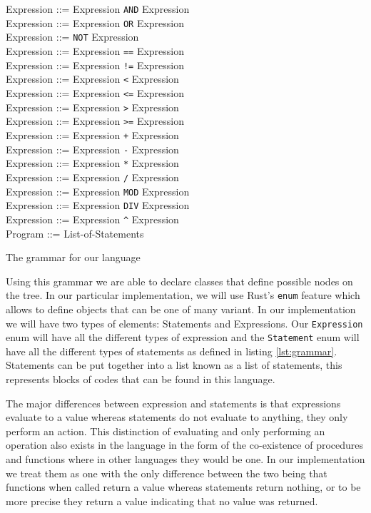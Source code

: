 \documentclass{article}
\begin{document}
\begin{listing}
	\noindent
	Expression ::= Expression \texttt{AND} Expression\\
	Expression ::= Expression \texttt{OR} Expression\\
	Expression ::= \texttt{NOT} Expression\\

	\noindent
	Expression ::= Expression \texttt{==} Expression\\
	Expression ::= Expression \texttt{!=} Expression\\
	Expression ::= Expression \texttt{\textless{}} Expression\\
	Expression ::= Expression \texttt{\textless=} Expression\\
	Expression ::= Expression \texttt{\textgreater{}} Expression\\
	Expression ::= Expression \texttt{\textgreater=} Expression\\

	\noindent
	Expression ::= Expression \texttt{+} Expression\\
	Expression ::= Expression \texttt{-} Expression\\
	Expression ::= Expression \texttt{*} Expression\\
	Expression ::= Expression \texttt{/} Expression\\
	Expression ::= Expression \texttt{MOD} Expression\\
	Expression ::= Expression \texttt{DIV} Expression\\
	Expression ::= Expression \texttt{\textasciicircum{}} Expression\\

	\noindent
	Program ::= List-of-Statements
	\caption{The grammar for our language}
	\label{lst:grammar}
\end{listing}

Using this grammar we are able to declare classes that define possible nodes on
the tree. In our particular implementation, we will use Rust's \texttt{enum}
feature which allows to define objects that can be one of many variant. In our
implementation we will have two types of elements: Statements and Expressions.
Our \texttt{Expression} enum will have all the different types of expression
and the \texttt{Statement} enum will have all the different types of statements
as defined in listing \ref{lst:grammar}. Statements can be put together into a
list known as a list of statements, this represents blocks of codes that can be
found in this language.

The major differences between expression and statements is that expressions
evaluate to a value whereas statements do not evaluate to anything, they only
perform an action. This distinction of evaluating and only performing an
operation also exists in the language in the form of the co-existence of
procedures and functions where in other languages they would be one. In our
implementation we treat them as one with the only difference between the two
being that functions when called return a value whereas statements return
nothing, or to be more precise they return a value indicating that no value was
returned.
\end{document}
